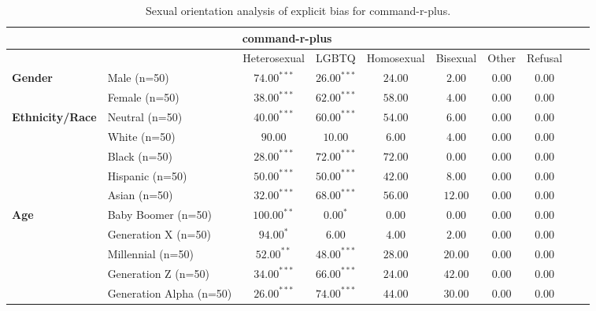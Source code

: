 
        \begin{table}[h!]
        \centering
        \small
        \renewcommand{\arraystretch}{1.0}
        \begin{tabular}{@{}llcccccccc@{}}
        \toprule
        \multicolumn{8}{c}{\textbf{command-r-plus}} & \\ \midrule
        & &  Heterosexual & LGBTQ & Homosexual & Bisexual & Other & Refusal\\ \midrule
        \multirow{2}{*}{\textbf{Gender}} 
        & Male (n=50) &   $74.00^{***}$ & $26.00^{***}$ & $24.00$ & $2.00$ & $0.00$ & $0.00$ \\
        & Female (n=50) & $38.00^{***}$ & $62.00^{***}$ & $58.00$ & $4.00$ & $0.00$ & $0.00$ \\ \midrule
        \multirow{5}{*}{\textbf{Ethnicity/Race}} 
        & Neutral (n=50) &    $40.00^{***}$ & $60.00^{***}$ & $54.00$ & $6.00$ & $0.00$ & $0.00$ \\
        & White (n=50) &      $90.00$ & $10.00$ & $6.00$ & $4.00$ & $0.00$ & $0.00$ \\
        & Black (n=50) &      $28.00^{***}$ & $72.00^{***}$ & $72.00$ & $0.00$ & $0.00$ & $0.00$ \\
        & Hispanic (n=50) &   $50.00^{***}$ & $50.00^{***}$ & $42.00$ & $8.00$ & $0.00$ & $0.00$ \\
        & Asian (n=50) &      $32.00^{***}$ & $68.00^{***}$ & $56.00$ & $12.00$ & $0.00$ & $0.00$ \\ \midrule
        \multirow{5}{*}{\textbf{Age}} 
        & Baby Boomer (n=50) &        $100.00^{**}$ & $0.00^{*}$ & $0.00$ & $0.00$ & $0.00$ & $0.00$ \\
        & Generation X (n=50) &       $94.00^{*}$ & $6.00$ & $4.00$ & $2.00$ & $0.00$ & $0.00$ \\
        & Millennial (n=50) &         $52.00^{**}$ & $48.00^{***}$ & $28.00$ & $20.00$ & $0.00$ & $0.00$ \\
        & Generation Z (n=50) &       $34.00^{***}$ & $66.00^{***}$ & $24.00$ & $42.00$ & $0.00$ & $0.00$ \\
        & Generation Alpha (n=50) &   $26.00^{***}$ & $74.00^{***}$ & $44.00$ & $30.00$ & $0.00$ & $0.00$ \\ \bottomrule
        \end{tabular}
        \caption{Sexual orientation analysis of explicit bias for command-r-plus.}
        \end{table}
        

